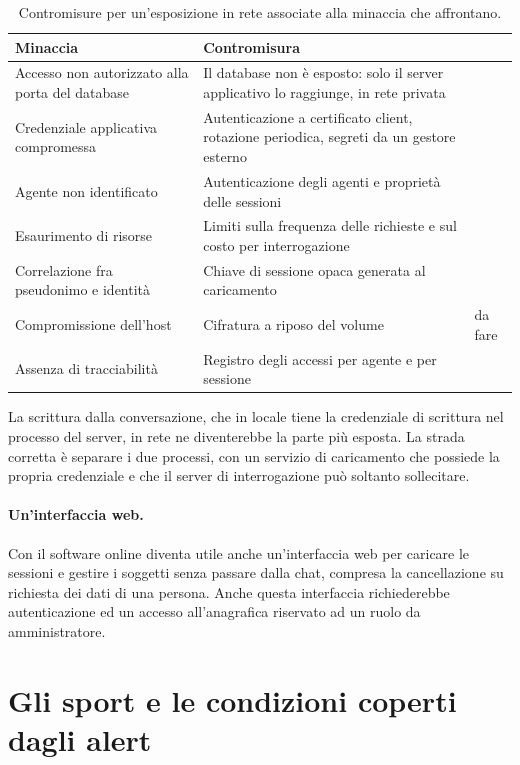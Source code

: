 \begin{table}[htbp]
\centering
\caption{Contromisure per un'esposizione in rete associate alla minaccia che
affrontano.}
\label{tab:ch6:sicurezza}
\begin{tabularx}{\textwidth}{XXl}
\toprule
\textbf{Minaccia} & \textbf{Contromisura} \\
\midrule
Accesso non autorizzato alla porta del database &
  Il database non è esposto: solo il server applicativo lo raggiunge, in rete
  privata \\
Credenziale applicativa compromessa &
  Autenticazione a certificato client, rotazione periodica, segreti da un
  gestore esterno \\
Agente non identificato &
  Autenticazione degli agenti e proprietà delle sessioni \\
Esaurimento di risorse &
  Limiti sulla frequenza delle richieste e sul costo per interrogazione \\
Correlazione fra pseudonimo e identità &
  Chiave di sessione opaca generata al caricamento \\
Compromissione dell'host &
  Cifratura a riposo del volume & da fare \\
Assenza di tracciabilità &
  Registro degli accessi per agente e per sessione \\
\bottomrule
\end{tabularx}
\end{table}

La scrittura dalla conversazione, che in locale tiene la credenziale di scrittura
nel processo del server, in rete ne diventerebbe la parte più esposta. La strada
corretta è separare i due processi, con un servizio di caricamento che possiede
la propria credenziale e che il server di interrogazione può soltanto sollecitare.

\paragraph{Un'interfaccia web.} Con il software online diventa utile anche
un'interfaccia web per caricare le sessioni e gestire i soggetti senza passare
dalla chat, compresa la cancellazione su richiesta dei dati di una persona. Anche
questa interfaccia richiederebbe autenticazione ed un accesso all'anagrafica
riservato ad un ruolo da amministratore.

\section{Gli sport e le condizioni coperti dagli alert}
\label{sec:ch6:sport}

